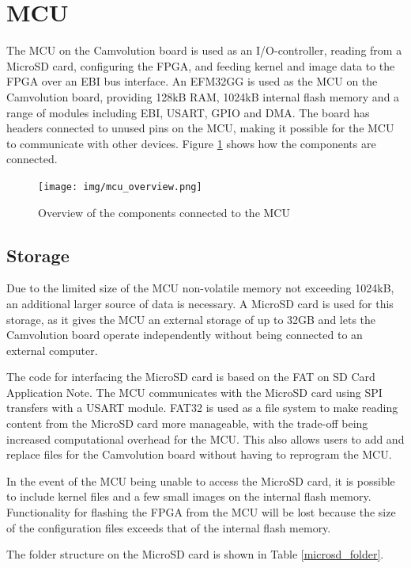 \section{MCU}

The MCU on the Camvolution board is used as an I/O-controller, reading from a MicroSD card, configuring the FPGA, and feeding kernel and image data to the FPGA over an EBI bus interface. An EFM32GG is used as the MCU on the Camvolution board, providing 128kB RAM, 1024kB internal flash memory and a range of modules including EBI, USART, GPIO and DMA. The board has headers connected to unused pins on the MCU, making it possible for the MCU to communicate with other devices. Figure \ref{fig:mcuOverview} shows how the components are connected.

\begin{figure}[h!]
    \texttt{[image: img/mcu\_overview.png]}
    \caption{Overview of the components connected to the MCU}
    \label{fig:mcuOverview}
\end{figure}

\subsection{Storage}
Due to the limited size of the MCU non-volatile memory not exceeding 1024kB, an additional larger source of data is necessary. A MicroSD card is used for this storage, as it gives the MCU an external storage of up to 32GB and lets the Camvolution board operate independently without being connected to an external computer.

The code for interfacing the MicroSD card is based on the FAT on SD Card Application Note\cite{an0030}. The MCU communicates with the MicroSD card using SPI transfers with a USART module. FAT32 is used as a file system to make reading content from the MicroSD card more manageable, with the trade-off being increased computational overhead for the MCU. This also allows users to add and replace files for the Camvolution board without having to reprogram the MCU.

In the event of the MCU being unable to access the MicroSD card, it is possible to include kernel files and a few small images on the internal flash memory. Functionality for flashing the FPGA from the MCU will be lost because the size of the configuration files exceeds that of the internal flash memory.

The folder structure on the MicroSD card is shown in Table \ref{microsd_folder}.

